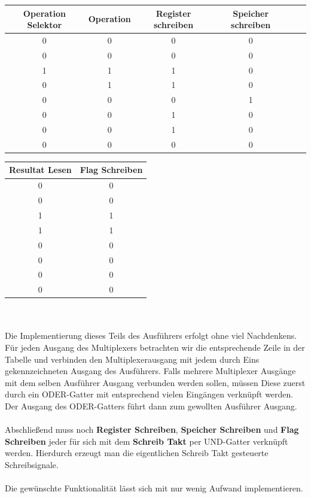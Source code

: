 \documentclass[11pt,a4paper,leqno]{report}
\numberwithin{equation}{chapter}
\begin{document}
\begin{center}
	\begin{tabular}{|c|c|c|c|c|c|}
		Operation Selektor & Operation & Register schreiben & Speicher schreiben \\
		\hline
		0 & 0 & 0 & 0\\
		0 & 0 & 0 & 0\\
		1 & 1 & 1 & 0\\
		0 & 1 & 1 & 0\\
		0 & 0 & 0 & 1\\
		0 & 0 & 1 & 0\\
		0 & 0 & 1 & 0\\
		0 & 0 & 0 & 0\\
	\end{tabular}  
\end{center}
\begin{tabular}{|c|c|}
		Resultat Lesen & Flag Schreiben \\
		\hline
		0 & 0\\
		0 & 0\\
		1 & 1\\
		1 & 1\\
		0 & 0\\
		0 & 0\\
		0 & 0\\
		0 & 0\\
\end{tabular}\\  
\\
Die Implementierung dieses Teils des Ausf\"uhrers erfolgt ohne viel Nachdenkens. Für jeden Ausgang des Multiplexers betrachten wir die entsprechende Zeile in der Tabelle und verbinden den Multiplexerausgang mit jedem durch Eins gekennzeichneten Ausgang des Ausf\"uhrers.
Falls mehrere Multiplexer Ausg\"ange mit dem selben Ausf\"uhrer Ausgang verbunden werden sollen, m\"ussen Diese zuerst durch ein ODER-Gatter mit entsprechend vielen Eing\"angen verkn\"upft werden. Der Ausgang des ODER-Gatters f\"uhrt dann zum gewollten Ausf\"uhrer Ausgang.\\
\\
Abschlie\ss{}end muss noch \textbf{Register Schreiben}, \textbf{Speicher Schreiben} und \textbf{Flag Schreiben} jeder f\"ur sich mit dem \textbf{Schreib Takt} per UND-Gatter verkn\"upft werden. Hierdurch erzeugt man die eigentlichen Schreib Takt gesteuerte Schreibsignale.\\
\\
Die gew\"unschte Funktionalit\"at l\"asst sich mit nur wenig Aufwand implementieren.
\end{document}

